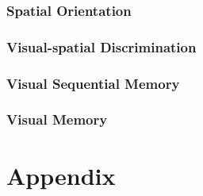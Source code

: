 \documentclass[journal]{IEEEtran}
\begin{document}
\subsubsection{Spatial Orientation}

\subsubsection{Visual-spatial Discrimination}

\subsubsection{Visual Sequential Memory}

\subsubsection{Visual Memory}




\section{Appendix}
\end{document}
